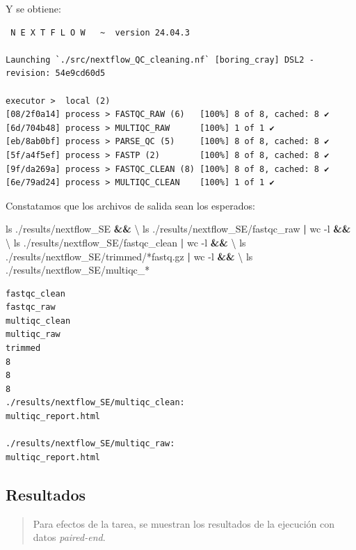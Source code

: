 \documentclass[
  letterpaper,
  DIV=11,
  numbers=noendperiod]{scrartcl}
\newenvironment{Shaded}{\begin{snugshade}}{\end{snugshade}}
\newcommand{\AttributeTok}[1]{\textcolor[rgb]{0.40,0.45,0.13}{#1}}
\newcommand{\DataTypeTok}[1]{\textcolor[rgb]{0.68,0.00,0.00}{#1}}
\newcommand{\FunctionTok}[1]{\textcolor[rgb]{0.28,0.35,0.67}{#1}}
\newcommand{\KeywordTok}[1]{\textcolor[rgb]{0.00,0.23,0.31}{\textbf{#1}}}
\newcommand{\NormalTok}[1]{\textcolor[rgb]{0.00,0.23,0.31}{#1}}
\newcommand{\PreprocessorTok}[1]{\textcolor[rgb]{0.68,0.00,0.00}{#1}}
\begin{document}
Y se obtiene:

\begin{verbatim}
 N E X T F L O W   ~  version 24.04.3

Launching `./src/nextflow_QC_cleaning.nf` [boring_cray] DSL2 - revision: 54e9cd60d5

executor >  local (2)
[08/2f0a14] process > FASTQC_RAW (6)   [100%] 8 of 8, cached: 8 ✔
[6d/704b48] process > MULTIQC_RAW      [100%] 1 of 1 ✔
[eb/8ab0bf] process > PARSE_QC (5)     [100%] 8 of 8, cached: 8 ✔
[5f/a4f5ef] process > FASTP (2)        [100%] 8 of 8, cached: 8 ✔
[9f/da269a] process > FASTQC_CLEAN (8) [100%] 8 of 8, cached: 8 ✔
[6e/79ad24] process > MULTIQC_CLEAN    [100%] 1 of 1 ✔
\end{verbatim}

Constatamos que los archivos de salida sean los esperados:

\begin{Shaded}
\begin{Highlighting}[]
\FunctionTok{ls}\NormalTok{ ./results/nextflow\_SE }\KeywordTok{\&\&} \DataTypeTok{\textbackslash{}}
\FunctionTok{ls}\NormalTok{ ./results/nextflow\_SE/fastqc\_raw }\KeywordTok{|} \FunctionTok{wc} \AttributeTok{{-}l} \KeywordTok{\&\&} \DataTypeTok{\textbackslash{}}
\FunctionTok{ls}\NormalTok{ ./results/nextflow\_SE/fastqc\_clean }\KeywordTok{|} \FunctionTok{wc} \AttributeTok{{-}l} \KeywordTok{\&\&} \DataTypeTok{\textbackslash{}}
\FunctionTok{ls}\NormalTok{ ./results/nextflow\_SE/trimmed/}\PreprocessorTok{*}\NormalTok{fastq.gz }\KeywordTok{|} \FunctionTok{wc} \AttributeTok{{-}l} \KeywordTok{\&\&} \DataTypeTok{\textbackslash{}}
\FunctionTok{ls}\NormalTok{ ./results/nextflow\_SE/multiqc\_}\PreprocessorTok{*}
\end{Highlighting}
\end{Shaded}

\begin{verbatim}
fastqc_clean
fastqc_raw
multiqc_clean
multiqc_raw
trimmed
8
8
8
./results/nextflow_SE/multiqc_clean:
multiqc_report.html

./results/nextflow_SE/multiqc_raw:
multiqc_report.html
\end{verbatim}

\subsection{Resultados}\label{resultados}

\begin{quote}
Para efectos de la tarea, se muestran los resultados de la ejecución con
datos \emph{paired-end}.
\end{quote}
\end{document}
